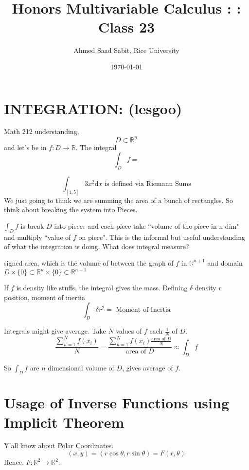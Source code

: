 \documentclass[letter]{article}
\title{Honors Multivariable Calculus : : Class 23}
\author{Ahmed Saad Sabit, Rice University}
\date{\today}
\begin{document}
\maketitle

\section*{INTEGRATION: (lesgoo)}
Math 212 understanding, 
\[
D \subset  \mathbb{R}^{n} 
\] 
and let's be in $f: D \to  \mathbb{R}$. The integral 
\[
\int_D f =
\] 

\[
	\int_{[1,5]} 3x^2 \mathrm{d} x \text{ is defined via Riemann Sums}
\]
We just going to think we are summing the area of a bunch of rectangles. 
So think about breaking the system into Pieces. 

$\int_D f$ is break $D$ into pieces and each piece take ``volume of the piece in n-dim" and multiply ``value of $f$ on piece". This 
is the informal but 
useful understanding of what the integration is doing. What does integral measure? 

signed area, which is the volume of between the graph of $f$ in $\mathbb{R}^{n+1}$ and domain $D \times \{0\} \subset \mathbb{R}^{n} \times \{0\} \subset \mathbb{R}^{n+1} $

If $f$ is density like stuffs, the integral gives the mass. Defining $\delta$ density $r$ position, moment of inertia
\[
\int_D \delta r^2 = \text{ Moment of Inertia}
\]

Integrals might give average. Take $N$ values of $f$ each $\frac{1}{N}$ of $D$. 
\[
\frac{\sum_{n=1}^{N} f(x_i)}{N} = \frac{\sum_{n=1}^{N} f(x_i) \frac{\text{area of } D}{N}}{\text{area of } D} \approx \int_D f
 \]

 So $\int_D f$ are $n$ dimensional volume of $D$, gives average of $f$. 




\section*{Usage of Inverse Functions using Implicit Theorem} 
Y'all know about Polar Coordinates.
\[
	(x,y) = (r \cos \theta , r \sin \theta) = F(r, \theta)
\] 
Hence, $F : \mathbb{R}^2 \to \mathbb{R}^2$.

\end{document}
